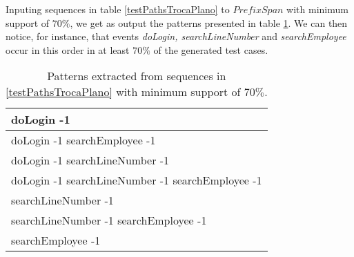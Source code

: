 Inputing sequences in table \ref{testPathsTrocaPlano} to $PrefixSpan$ with minimum support of $70\%$, we get as output the patterns presented in table \ref{patternsTrocaPlano}. We can then notice, for instance, that events \textit{doLogin, searchLineNumber} and \textit{searchEmployee} occur in this order in at least $70\%$ of the generated test cases.

\begin{table}[h]
\begin{center}
\begin{tabular}{|l|}

\hline

doLogin -1  \\ \hline
doLogin -1 searchEmployee -1 \\ \hline
doLogin -1 searchLineNumber -1  \\ \hline
doLogin -1 searchLineNumber -1 searchEmployee -1  \\ \hline
searchLineNumber -1  \\ \hline
searchLineNumber -1 searchEmployee -1  \\ \hline
searchEmployee -1 \\

\hline
\end{tabular}
\end{center}
\caption{Patterns extracted from sequences in \ref{testPathsTrocaPlano} with minimum support of $70\%$.}
\label{patternsTrocaPlano}
\end{table}

